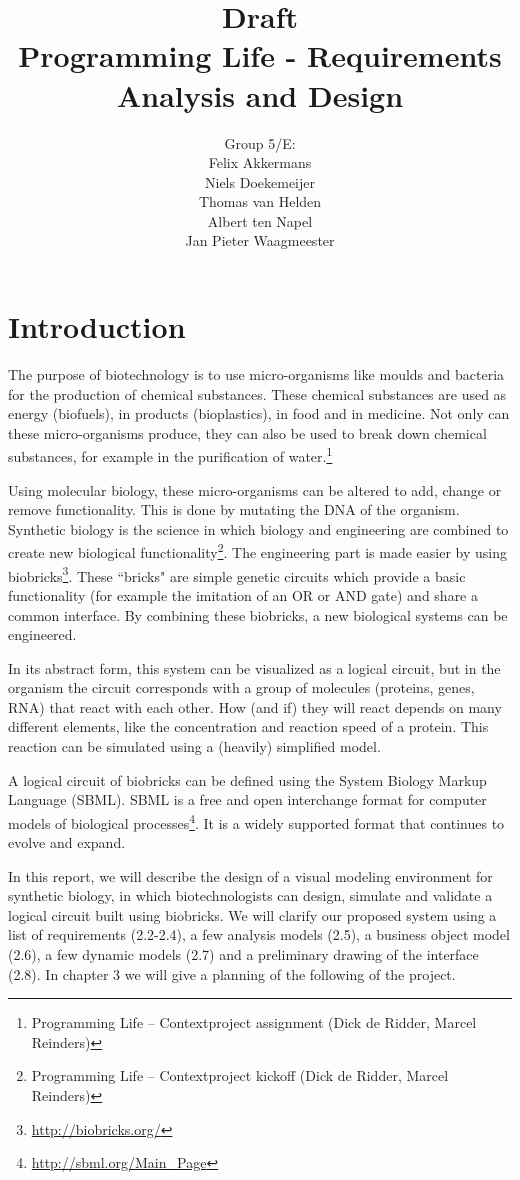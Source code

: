 \documentclass[a4paper]{article}
\title{{\sc Draft} \\Programming Life - Requirements Analysis and Design }
\author{Group 5/E:\\
Felix Akkermans \\
Niels Doekemeijer \\
Thomas van Helden \\
Albert ten Napel \\
Jan Pieter Waagmeester}
\begin{document}
\maketitle

\vfill

\small{\tableofcontents}
\pagebreak
\section{Introduction} 		%
The purpose of biotechnology is to use micro-organisms like moulds and bacteria for the production of chemical substances. These chemical substances are used as energy (biofuels), in products (bioplastics), in food and in medicine. Not only can these micro-organisms produce, they can also be used to break down chemical substances, for example in the purification of water.\footnote{Programming Life – Contextproject assignment (Dick de Ridder, Marcel Reinders)}

Using molecular biology, these micro-organisms can be altered to add, change or remove functionality. This is done by mutating the DNA of the organism. Synthetic biology is the science in which biology and engineering are combined to create new biological functionality\footnote{Programming Life – Contextproject kickoff (Dick de Ridder, Marcel Reinders)}. The engineering part is made easier by using biobricks\footnote{\url{http://biobricks.org/}}. These ``bricks" are simple genetic circuits which provide a basic functionality (for example the imitation of an OR or AND gate) and share a common interface. By combining these biobricks, a new biological systems can be engineered.

In its abstract form, this system can be visualized as a logical circuit, but in the organism the circuit corresponds with a group of molecules (proteins, genes, RNA) that react with each other. How (and if) they will react depends on many different elements, like the concentration and reaction speed of a protein. This reaction can be simulated using a (heavily) simplified model\footnotemark[1].

A logical circuit of biobricks can be defined using the System Biology Markup Language (SBML). SBML is a free and open interchange format for computer models of biological processes\footnote{\url{http://sbml.org/Main_Page}}. It is a widely supported format that continues to evolve and expand.

In this report, we will describe the design of a visual modeling environment for synthetic biology, in which biotechnologists can design, simulate and validate a logical circuit built using biobricks. We will clarify our proposed system using a list of requirements (2.2-2.4), a few analysis models (2.5), a business object model (2.6), a few dynamic models (2.7) and a preliminary drawing of the interface (2.8). In chapter 3 we will give a planning of the following of the project.
\end{document}
